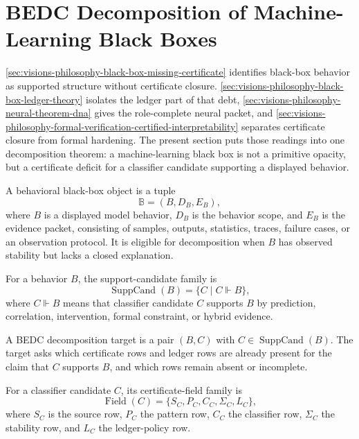 \section{BEDC Decomposition of Machine-Learning Black Boxes}
\label{sec:visions-philosophy-black-box-decomposition}

\autoref{sec:visions-philosophy-black-box-missing-certificate}
identifies black-box behavior as supported structure without certificate
closure. \autoref{sec:visions-philosophy-black-box-ledger-theory}
isolates the ledger part of that debt,
\autoref{sec:visions-philosophy-neural-theorem-dna} gives the
role-complete neural packet, and
\autoref{sec:visions-philosophy-formal-verification-certified-interpretability}
separates certificate closure from formal hardening. The present section
puts those readings into one decomposition theorem: a machine-learning
black box is not a primitive opacity, but a certificate deficit for a
classifier candidate supporting a displayed behavior.

\begin{definition}
\label{def:philosophy-behavioral-black-box-object}
A behavioral black-box object is a tuple
$$
\mathbb B=(B,D_B,E_B),
$$
where $B$ is a displayed model behavior, $D_B$ is the behavior scope,
and $E_B$ is the evidence packet, consisting of samples, outputs,
statistics, traces, failure cases, or an observation protocol. It is
eligible for decomposition when $B$ has observed stability but lacks a
closed explanation.
\end{definition}

\begin{definition}
\label{def:philosophy-support-candidates}
For a behavior $B$, the support-candidate family is
$$
\operatorname{SuppCand}(B)
=
\{C\mid C\Vdash B\},
$$
where $C\Vdash B$ means that classifier candidate $C$ supports $B$ by
prediction, correlation, intervention, formal constraint, or hybrid
evidence.
\end{definition}

\begin{definition}
\label{def:philosophy-decomposition-target}
A BEDC decomposition target is a pair $(B,C)$ with
$C\in\operatorname{SuppCand}(B)$. The target asks which certificate rows
and ledger rows are already present for the claim that $C$ supports
$B$, and which rows remain absent or incomplete.
\end{definition}

\begin{definition}
\label{def:philosophy-certificate-fields}
For a classifier candidate $C$, its certificate-field family is
$$
\operatorname{Field}(C)
=
\{S_C,P_C,C_C,\Sigma_C,L_C\},
$$
where $S_C$ is the source row, $P_C$ the pattern row, $C_C$ the
classifier row, $\Sigma_C$ the stability row, and $L_C$ the ledger-policy
row.
\end{definition}

